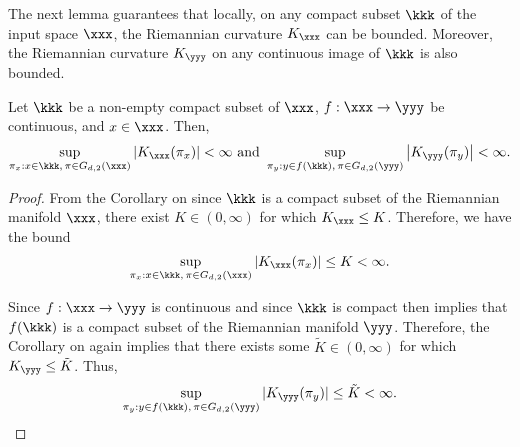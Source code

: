 The next lemma guarantees that locally, on any compact subset $\kkk$ of the input space $\xxx$, the Riemannian curvature $K_{\xxx}$ can be bounded.  Moreover, the Riemannian curvature $K_{\yyy}$ on any continuous image of $\kkk$ is also bounded.  
\begin{lemma}\label{lem_finitness_guarantee}
Let $\kkk$ be a non-empty compact subset of $\xxx$, $f:\xxx\rightarrow \yyy$ be continuous, and $x \in \xxx$.  Then, 
$$
\sup_{\pi_x:x\in \kkk, \,\pi \in G_{d,2}(\xxx)} 
\left|
K_{\xxx}(\pi_x)
\right|
<\infty
\mbox{ and }
\sup_{\pi_y:y\in f(\kkk), \,\pi \in G_{d,2}(\yyy)} \left|
K_{\yyy}(\pi_y)
\right|<\infty
.
$$
\end{lemma}
\begin{proof}
From the Corollary on \citep[page 167 (there is no numbering)]{BishopGeometry} since 
$\kkk$ is a compact subset of the Riemannian manifold $\xxx$, 
there exist $K \in (0,\infty)$ for which $K_{\xxx}\leq K$.  Therefore, we have the bound 
$$
\sup_{\pi_x:x\in \kkk, \,\pi \in G_{d,2}(\xxx)}  
|K_{\xxx}(\pi_x)|\leq K<\infty.
$$  

Since $f:\xxx\rightarrow \yyy$ is continuous and since $\kkk$ is compact then \citep[Theorem 26.5]{munkres2014topology} implies that $f(\kkk)$ is a compact subset of the Riemannian manifold $\yyy$.  Therefore, the Corollary on \citep[page 167]{BishopGeometry} again implies that there exists some $\tilde{K}\in (0,\infty)$ for which $K_{\yyy}\leq \tilde{K}$.  Thus, 
$$
\sup_{\pi_y:y\in f(\kkk), \,\pi \in G_{d,2}(\yyy)} |K_{\yyy}(\pi_y)|\leq\tilde{K}<\infty
.
$$
\end{proof}